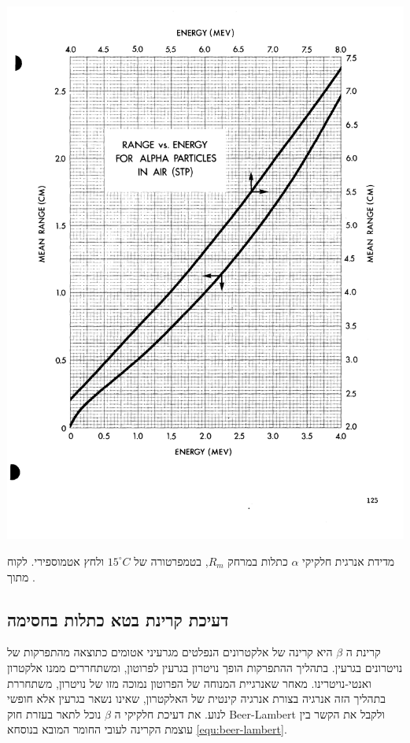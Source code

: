 \documentclass{article}
\begin{document}
\begin{graph}
    \centering
    \includegraphics[width=\textwidth]{./ISL/radiological-alpha-energies.png}
    \caption{
    מדידת אנרגית חלקיקי
    $\alpha$
    כתלות במרחק
    $R_m$,
    בטמפרטורה של
    $15^{\circ}C$
    ולחץ אטמוספירי.
    לקוח מתוך
    \cite{RadiologicalHandbook}.
    }
    \label{graph:alpha-energies}
\end{graph}

\subsection{
דעיכת קרינת בטא כתלות בחסימה
}
קרינת ה
$\beta$
היא קרינה של אלקטרונים הנפלטים מגרעיני אטומים כתוצאה מהתפרקות של נויטרונים בגרעין. בתהליך ההתפרקות הופך נויטרון בגרעין לפרוטון, ומשתחררים ממנו אלקטרון ואנטי-נויטרינו. מאחר שאנרגיית המנוחה של הפרוטון נמוכה מזו של נויטרון, משתחררת בתהליך הזה אנרגיה בצורת אנרגיה קינטית של האלקטרון, שאינו נשאר בגרעין אלא חופשי לנוע.
את דעיכת חלקיקי ה
$\beta$
נוכל לתאר בעזרת חוק
\textenglish{Beer-Lambert}\cite{Manual}
ולקבל את הקשר בין עוצמת הקרינה לעובי החומר המובא בנוסחא
\ref{equ:beer-lambert}.
\end{document}
